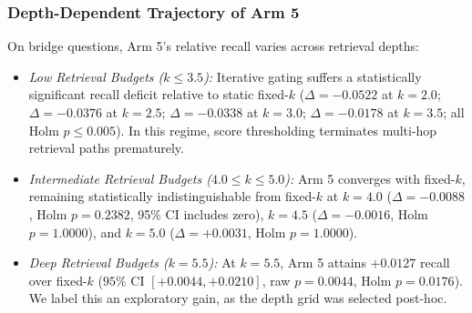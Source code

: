 \documentclass[conference]{IEEEtran}
\begin{document}
\subsubsection{Depth-Dependent Trajectory of Arm 5}
On bridge questions, Arm 5's relative recall varies across retrieval depths:
\begin{itemize}
    \item \textit{Low Retrieval Budgets ($k \le 3.5$):} Iterative gating suffers a statistically significant recall deficit relative to static fixed-$k$ ($\Delta = -0.0522$ at $k=2.0$; $\Delta = -0.0376$ at $k=2.5$; $\Delta = -0.0338$ at $k=3.0$; $\Delta = -0.0178$ at $k=3.5$; all Holm $p \le 0.005$). In this regime, score thresholding terminates multi-hop retrieval paths prematurely.
    \item \textit{Intermediate Retrieval Budgets ($4.0 \le k \le 5.0$):} Arm 5 converges with fixed-$k$, remaining statistically indistinguishable from fixed-$k$ at $k=4.0$ ($\Delta = -0.0088$, Holm $p = 0.2382$, 95\% CI includes zero), $k=4.5$ ($\Delta = -0.0016$, Holm $p = 1.0000$), and $k=5.0$ ($\Delta = +0.0031$, Holm $p = 1.0000$).
    \item \textit{Deep Retrieval Budgets ($k=5.5$):} At $k=5.5$, Arm 5 attains $+0.0127$ recall over fixed-$k$ ($95\%$ CI $[+0.0044, +0.0210]$, raw $p=0.0044$, Holm $p=0.0176$). We label this an exploratory gain, as the depth grid was selected post-hoc.
\end{itemize}
\end{document}
